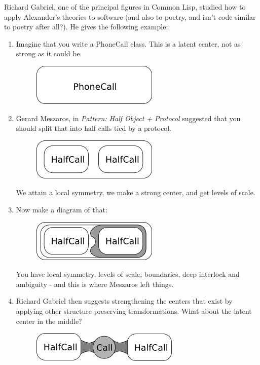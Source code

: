 Richard Gabriel, one of the principal figures in Common Lisp, studied how to apply Alexander's theories to software (and also to poetry, and isn't code similar to poetry after all?).  He gives the following example:
\begin{enumerate}
 \item Imagine that you write a PhoneCall class. This is a latent center, not as strong as it could be.
   \begin{figure}[h!]
     \centering
     \includegraphics[scale=0.6,keepaspectratio=true]{./usability/federico1.png}
   \end{figure}
 \item Gerard Meszaros, in \textit{Pattern: Half Object + Protocol} suggested that you should split that into half calls tied by a protocol.
   \begin{figure}[h!]
     \centering
     \includegraphics[scale=0.6,keepaspectratio=true]{./usability/federico2.png}
   \end{figure}
 We attain a local symmetry, we make a strong center, and get levels of scale.
 \item Now make a diagram of that:
   \begin{figure}[h!]
     \centering
     \includegraphics[scale=0.6,keepaspectratio=true]{./usability/federico3.png}
   \end{figure}
 You have local symmetry, levels of scale, boundaries, deep interlock and ambiguity - and this is where Meszaros left things.
 \item Richard Gabriel then suggests strengthening the centers that exist by applying other structure-preserving transformations. What about the latent center in the middle?
   \begin{figure}[h!]
     \centering
     \includegraphics[scale=0.6,keepaspectratio=true]{./usability/federico4.png}

\end{figure}
\end{enumerate}
